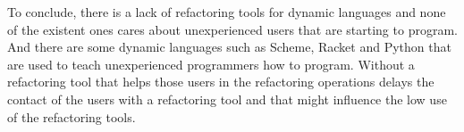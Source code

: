 






To conclude, there is a lack of refactoring tools for dynamic languages and none of the existent ones cares about unexperienced users that are starting to program. 
And there are some dynamic languages such as Scheme, Racket and Python that are used to teach unexperienced programmers how to program.
Without a refactoring tool that helps those users in the refactoring operations delays the contact of the users with a refactoring tool and that might influence the low use of the refactoring tools.

